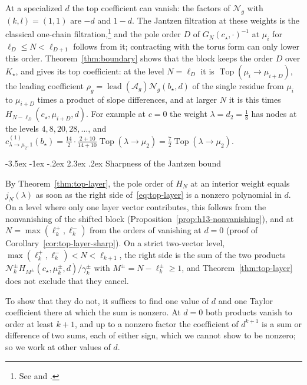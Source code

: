 \documentclass[twoside,10pt]{article}
\makeatletter
\numberwithin{equation}{section}
\theoremstyle{slbody}
\theoremstyle{definition}
\theoremstyle{remark}
\renewcommand{\section}{%
  \@startsection{section}{1}{\z@}%
    {-3.5ex \@plus -1ex \@minus -.2ex}%
    {2.3ex \@plus .2ex}%
    {\normalfont\large\bfseries}}
\makeatother
\begin{document}
At a specialized $d$ the top coefficient can vanish: the factors of
${\mathcal N}_g$ with $(k,l)=(1,1)$ are $-d$ and $1-d$.  The Jantzen filtration
at these weights is the classical one-chain filtration,\footnote{See
\cite[Theorem~6.3(ii)--(iv) and (6.4)]{IoharaKoga2011} and
\cite[Theorem~B]{Astashkevich1997}.} and the pole order $D$ of
$G_N(c_\star,\cdot)^{-1}$ at $\mu_i$ for $\ell_D\leq N<\ell_{D+1}$ follows from
it; contracting with the torus form can only lower this order.
Theorem~\ref{thm:boundary} shows that the block keeps the order $D$ over $K_\star$,
and gives its top coefficient: at the level $N=\ell_D$ it is
$\operatorname{Top}(\mu_i\to\mu_{i+D})$, the leading coefficient
$\rho_g=\operatorname{lead}({\mathcal A}_g){\mathcal N}_g(b_\star,d)$ of the single
residue from $\mu_i$ to $\mu_{i+D}$ times a product of slope differences, and at
larger $N$ it is this times $H_{N-\ell_D}(c_\star,\mu_{i+D},d)$.  For
example at $c=0$ the weight $\lambda=d_2=\frac18$ has nodes at the levels
$4,8,20,28,\dots$, and
$c^{(1)}_{\lambda\to\mu_2,1}(b_\star)=\frac{14}2\cdot\frac{2+10}{14+10}
\operatorname{Top}(\lambda\to\mu_2)=\frac72\operatorname{Top}(\lambda\to\mu_2)$.

\section{Sharpness of the Jantzen bound}\label{sec:sharpness}

By Theorem~\ref{thm:top-layer}, the pole order of \(H_N\) at an interior
weight equals \(j_N(\lambda)\) as soon as the right side
of~\eqref{eq:top-layer} is a nonzero polynomial in \(d\).  On a level where
only one layer vector contributes, this follows from the nonvanishing of the
shifted block (Proposition~\ref{prop:h13-nonvanishing}), and at
\(N=\max(\ell^+_k,\ell^-_k)\) from the orders of vanishing at \(d=0\) (proof
of Corollary~\ref{cor:top-layer-sharp}).  On a strict two-vector level,
\(\max(\ell^+_k,\ell^-_k)<N<\ell_{k+1}\), the right side is the sum of the two
products
\(\mathcal N^\pm_kH_{M^\pm}(c_\star,\mu^\pm_k,d)/\gamma^\pm_k\) with
\(M^\pm=N-\ell^\pm_k\geq1\), and Theorem~\ref{thm:top-layer} does not exclude
that they cancel.

To show that they do not, it suffices to find one value of \(d\) and one
Taylor coefficient there at which the sum is nonzero.  At \(d=0\) both
products vanish to order at least \(k+1\), and up to a nonzero factor the
coefficient of \(d^{k+1}\) is a sum or difference of two sums, each of either
sign, which we cannot show to be nonzero; so we work at other values of
\(d\).
\end{document}
